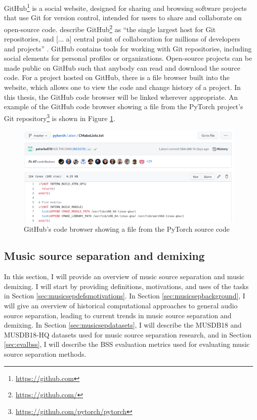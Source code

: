 \documentclass[report.tex]{subfiles}
\begin{document}
GitHub\footnote{\url{https://github.com}} is a social website, designed for sharing and browsing software projects that use Git for version control, intended for users to share and collaborate on open-source code. \citeauthor{gitbook} describe GitHub\footnote{\url{https://github.com/}} as ``the single largest host for Git repositories, and [... a] central point of collaboration for millions of developers and projects'' \parencite[131]{gitbook}. GitHub contains tools for working with Git repositories, including social elements for personal profiles or organizations. Open-source projects can be made public on GitHub such that anybody can read and download the source code. For a project hosted on GitHub, there is a file browser built into the website, which allows one to view the code and change history of a project. In this thesis, the GitHub code browser will be linked wherever appropriate. An example of the GitHub code browser showing a file from the PyTorch project's Git repository\footnote{\url{https://github.com/pytorch/pytorch}} is shown in Figure \ref{fig:githubpytorch}.

\begin{figure}[ht]
	\centering
	\includegraphics[width=\textwidth]{./images-misc/github.png}
	\caption{GitHub's code browser showing a file from the PyTorch source code}
	\label{fig:githubpytorch}
\end{figure}

\newpagefill

\subsection{Music source separation and demixing}
\label{sec:musicsep}

In this section, I will provide an overview of music source separation and music demixing. I will start by providing definitions, motivations, and uses of the tasks in Section \ref{sec:musicsepdefsmotivations}. In Section \ref{sec:musicsepbackground}, I will give an overview of historical computational approaches to general audio source separation, leading to current trends in music source separation and demixing. In Section \ref{sec:musicsepdatasets}, I will describe the MUSDB18 and MUSDB18-HQ datasets used for music source separation research, and in Section \ref{sec:evalbss}, I will describe the BSS evaluation metrics used for evaluating music source separation methods.
\end{document}
